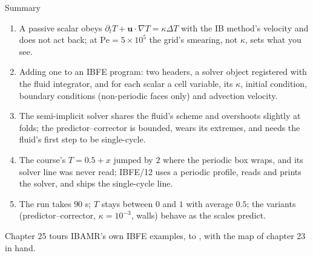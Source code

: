 \documentclass[aspectratio=169,11pt]{beamer}
\begin{document}
\begin{frame}{Summary}
\label{fr:summary}
\footnotesize
\begin{enumerate}
  \item A passive scalar obeys $\partial_t T + \mathbf{u}\cdot\nabla T = \kappa\Delta T$ with the IB method's velocity and does not act back; at $\mathrm{Pe} = 5\times10^5$ the grid's smearing, not $\kappa$, sets what you see.
  \item Adding one to an IBFE program: two headers, a solver object registered with the fluid integrator, and for each scalar a cell variable, its $\kappa$, initial condition, boundary conditions (non-periodic faces only) and advection velocity.
  \item The semi-implicit solver shares the fluid's scheme and overshoots slightly at folds; the predictor--corrector is bounded, wears its extremes, and needs the fluid's first step to be single-cycle.
  \item The course's $T = 0.5 + x$ jumped by $2$ where the periodic box wraps, and its solver line was never read; IBFE/12 uses a periodic profile, reads and prints the solver, and ships the single-cycle line.
  \item The run takes $90$ s; $T$ stays between $0$ and $1$ with average $0.5$; the variants (predictor--corrector, $\kappa = 10^{-3}$, walls) behave as the scales predict.
\end{enumerate}
\begin{homebox}
\footnotesize Chapter 25 tours IBAMR's own IBFE examples,  to , with the map of chapter 23 in hand.
\end{homebox}
\end{frame}
\end{document}
